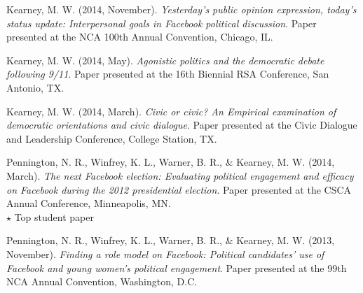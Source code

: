\begin{bibenum}
    \item[] Kearney, M. W. (2014, November).
      \textit{Yesterday's public opinion expression, today's status update: Interpersonal goals in Facebook political discussion}.
      Paper presented at the NCA 100th Annual Convention, Chicago, IL.
    \item[] Kearney, M. W. (2014, May).
      \textit{Agonistic politics and the democratic debate following 9/11}.
      Paper presented at the 16th Biennial RSA Conference, San Antonio, TX.
    \item[] Kearney, M. W. (2014, March).
      \textit{Civic or civic? An Empirical examination of democratic orientations and civic dialogue}.
      Paper presented at the Civic Dialogue and Leadership Conference, College Station, TX.
    \item[] Pennington, N. R., Winfrey, K. L., Warner, B. R., \& Kearney, M. W. (2014, March).
      \textit{The next Facebook election: Evaluating political engagement and efficacy on Facebook during the 2012 presidential election}.
      Paper presented at the CSCA Annual Conference, Minneapolis, MN.\\
      {$\star$} Top student paper
    \item[] Pennington, N. R., Winfrey, K. L., Warner, B. R., \& Kearney, M. W. (2013, November).
      \textit{Finding a role model on Facebook: Political candidates' use of Facebook and young women's political engagement}.
      Paper presented at the 99th NCA Annual Convention, Washington, D.C.
  \end{bibenum}

  \vspace{1.5em}
